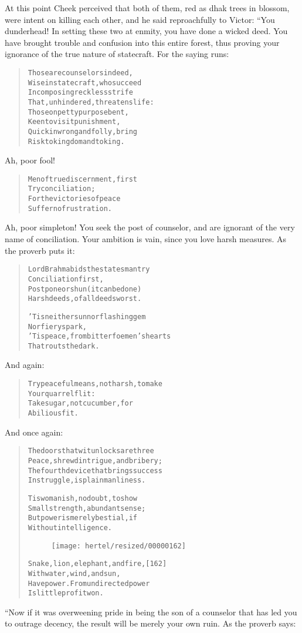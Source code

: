 \documentclass[article, twoside, 10pt]{memoir}
\renewenvironment{verbatim}{%
\begin{quote}%
\vskip -10pt%
\begin{alltt}\normalfont\small}{\end{alltt}%
\end{quote}%
\vskip -10pt
} %
\begin{document}
At this point Cheek perceived that both of them, red as dhak trees
in blossom, were intent on killing each other, and he said
reproachfully to Victor: “You dunderhead! In setting these two at
enmity, you have done a wicked deed. You have brought trouble and
confusion into this entire forest, thus proving your ignorance of
the true nature of statecraft. For the saying runs:

\begin{verbatim}
Those are counselors indeed,
Wise in statecraft, who succeed
In composing reckless strife
That, unhindered, threatens life:
Those on petty purpose bent,
Keen to visit punishment,
Quick in wrong and folly, bring
Risk to kingdom and to king.
\end{verbatim}
Ah, poor fool!

\begin{verbatim}
Men of true discernment, first
    Try conciliation;
For the victories of peace
    Suffer no frustration.
\end{verbatim}
Ah, poor simpleton! You seek the post of counselor, and are
ignorant of the very name of conciliation. Your ambition is vain,
since you love harsh measures. As the proverb puts it:

\begin{verbatim}
Lord Brahma bids the statesman try
    Conciliation first,
Postpone or shun (it can be done)
    Harsh deeds, of all deeds worst.

'Tis neither sun nor flashing gem
    Nor fiery spark,
'Tis peace, from bitter foemen's hearts
    That routs the dark.
\end{verbatim}
And again:

\begin{verbatim}
Try peaceful means, not harsh, to make
    Your quarrel flit:
Take sugar, not cucumber, for
    A bilious fit.
\end{verbatim}
And once again:

\begin{verbatim}
The doors that wit unlocks are three{\textemdash}
Peace, shrewd intrigue, and bribery;
The fourth device that brings success
In struggle, is plain manliness.

Tis womanish, no doubt, to show
    Small strength, abundant sense;
But power is merely bestial, if
    Without intelligence.

\begin{figure}[p]\texttt{[image: hertel/resized/00000162]}\end{figure}Snake, lion, elephant, and fire,                        [162]
    With water, wind, and sun,
Have power. From undirected power
    Is little profit won.
\end{verbatim}
“Now if it was overweening pride in being the son of a counselor
that has led you to outrage decency, the result will be merely your
own ruin. As the proverb says:
\end{document}
